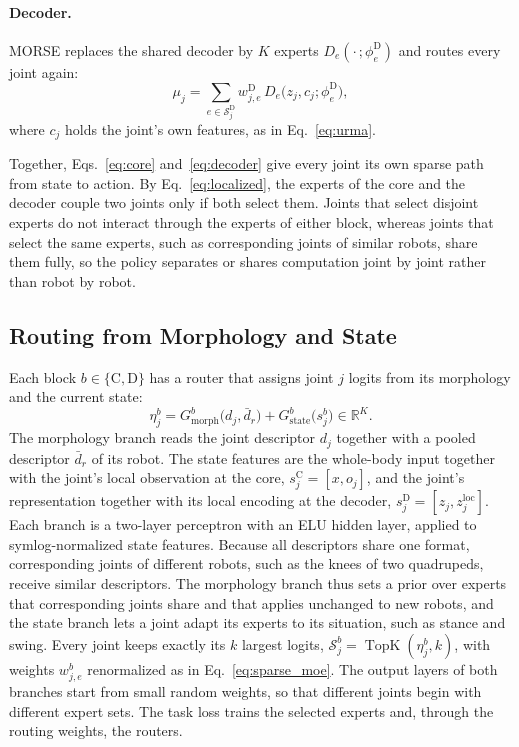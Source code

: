 \paragraph{Decoder.}
MORSE replaces the shared decoder by $K$ experts $D_e(\cdot\,;\phi^{\mathrm{D}}_e)$ and routes every joint again:
\begin{equation}
\mu_j=\sum_{e\in\mathcal{S}^{\mathrm{D}}_j}w^{\mathrm{D}}_{j,e}\,D_e\bigl(z_j,c_j;\phi^{\mathrm{D}}_e\bigr),
\label{eq:decoder}
\end{equation}
where $c_j$ holds the joint's own features, as in Eq.~\eqref{eq:urma}.

Together, Eqs.~\eqref{eq:core} and~\eqref{eq:decoder} give every joint its own sparse path from state to action. By
Eq.~\eqref{eq:localized}, the experts of the core and the decoder couple two joints only if both select them. Joints
that select disjoint experts do not interact through the experts of either block, whereas joints that select the same
experts, such as corresponding joints of similar robots, share them fully, so the policy separates or shares computation
joint by joint rather than robot by robot.

\subsection{Routing from Morphology and State}
\label{sec:routing}

Each block $b\in\{\mathrm{C},\mathrm{D}\}$ has a router that assigns joint $j$ logits from its morphology and the
current state:
\begin{equation}
\eta^{b}_j=G^{b}_{\mathrm{morph}}\bigl(d_j,\bar d_r\bigr)+G^{b}_{\mathrm{state}}\bigl(s^{b}_j\bigr)\in\mathbb{R}^{K}.
\label{eq:router}
\end{equation}
The morphology branch reads the joint descriptor $d_j$ together with a pooled descriptor $\bar d_r$ of its robot. The
state features are the whole-body input together with the joint's local observation at the core, $s^{\mathrm{C}}_j=
[x,o_j]$, and the joint's representation together with its local encoding at the decoder, $s^{\mathrm{D}}_j=
[z_j,z^{\mathrm{loc}}_j]$. Each branch is a two-layer perceptron with an ELU hidden layer, applied to symlog-normalized
state features. Because all descriptors share one format, corresponding joints of different robots, such as the knees of
two quadrupeds, receive similar descriptors. The morphology branch thus sets a prior over experts that corresponding
joints share and that applies unchanged to new robots, and the state branch lets a joint adapt its experts to its
situation, such as stance and swing. Every joint keeps exactly its $k$ largest logits,
$\mathcal{S}^{b}_j=\operatorname{TopK}(\eta^{b}_j,k)$, with weights $w^{b}_{j,e}$ renormalized as in
Eq.~\eqref{eq:sparse_moe}. The output layers of both branches start from small random weights, so that different joints
begin with different expert sets. The task loss trains the selected experts and, through the routing weights, the
routers.


